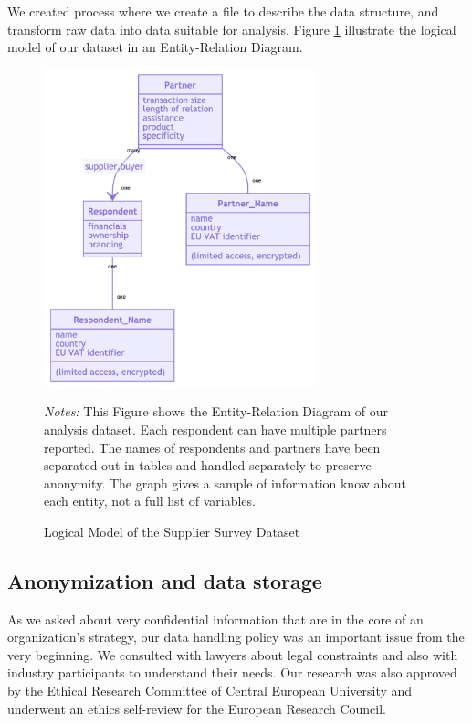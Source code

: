 \documentclass[final, dvipsnames, authoryear,12pt]{elsarticle}
\begin{document}
We created process where we create a file to describe the data structure, and transform raw data into data suitable for analysis. Figure \ref{fig:ERD} illustrate the logical model of our dataset in an Entity-Relation Diagram.

\begin{figure}[!h]
    \caption{Logical Model of the Supplier Survey Dataset}
    \label{fig:ERD} 
    \begin{center}    
    \includegraphics[width=0.7\textwidth]{graphs/ERD.png}
     \end{center}    
        {\footnotesize \textit{Notes:} This Figure shows the Entity-Relation Diagram of our analysis dataset. Each respondent can have multiple partners reported. The names of respondents and partners have been separated out in tables and handled separately to preserve anonymity. The graph gives a sample of information know about each entity, not a full list of variables.} 
\end{figure}

\subsection{Anonymization and data storage} 
As we asked about very confidential information that are in the core of an organization’s strategy, our data handling policy was an important issue from the very beginning. We consulted with lawyers about legal constraints and also with industry participants to understand their needs. Our research was also approved by the Ethical Research Committee of Central European University and underwent an ethics self-review for the European Research Council.
\end{document}

